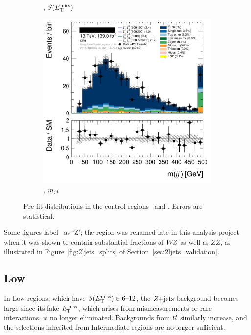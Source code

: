 \begin{figure}[tp]
\begin{subfigure}{0.495\textwidth}
\caption{\crtt, $S(E_\mathrm{T}^\mathrm{miss})$}
\end{subfigure}
\hfill
\begin{subfigure}{0.495\textwidth}
\centering
\includegraphics[width=\textwidth]{figures/2ljets_def_mjj_CRtt.png}
\caption{\crtt, $m_{jj}$}
\end{subfigure}
\caption[
Pre-fit distributions in the control regions CR-tt and CR-VZ
]{%
Pre-fit distributions in the control regions \crtt\ and \crvz.
Errors are statistical.
}
\label{fig:2ljets_int_cr_region}
\end{figure}

Some figures label \crvz\ as `\crz Z'; the region was renamed late in this
analysis project when it was shown to contain substantial fractions of
$W\kern-0.4exZ$ as well as $ZZ$, as illustrated in
Figure~\ref{fig:2ljets_splits} of
Section~\ref{sec:2ljets_validation}.


\subsection{Low}
\label{sec:2ljets_low}
In Low regions, which have $S(E_\mathrm{T}^\mathrm{miss}) \in 6\textrm{--}12$, the $Z\mathrm{+jets}$
background becomes large since its fake $E_\mathrm{T}^\mathrm{miss}$, which arises from
mismeasurements or rare interactions, is no longer eliminated.
Backgrounds from $t\bar t$ similarly increase, and the selections inherited from
Intermediate regions are no longer sufficient.

